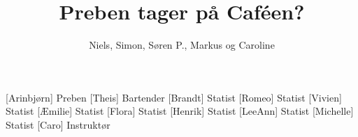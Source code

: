 \documentclass[a4paper,11pt]{article}
\title{Preben tager på Caféen?}
\author{Niels, Simon, Søren P., Markus og Caroline}
\begin{document}
\maketitle

\begin{roles}
  [Arinbjørn] Preben
  [Theis] Bartender
  [Brandt] Statist
  [Romeo] Statist
  [Vivien] Statist
  [Æmilie] Statist
  [Flora] Statist
  [Henrik] Statist
  [LeeAnn] Statist
  [Michelle] Statist
  [Caro] Instruktør
\end{roles}

\begin{sketch}


\end{sketch}
\end{document}
